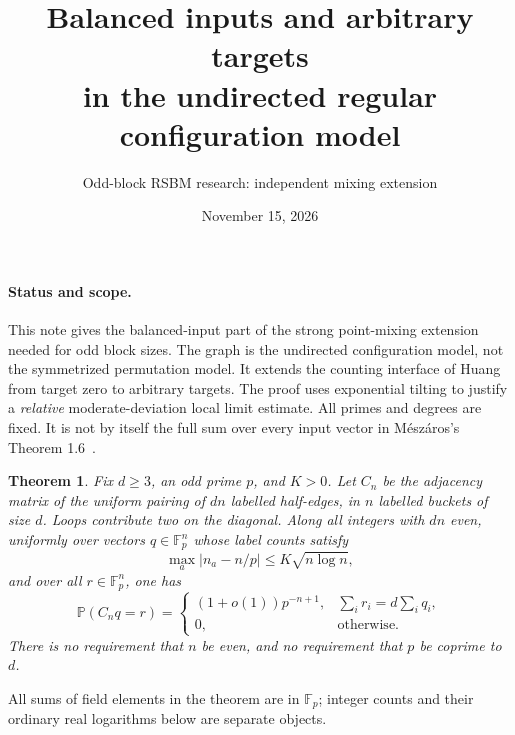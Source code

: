 \documentclass[11pt]{article}
\title{Balanced inputs and arbitrary targets\protect\\in the undirected regular configuration model}
\author{Odd-block RSBM research: independent mixing extension}
\date{November 15, 2026}
\newtheorem{theorem}{Theorem}
\newcommand{\Fp}{\mathbb F_p}
\newcommand{\Prob}{\mathbb P}
\begin{document}
\maketitle

\paragraph{Status and scope.}
This note gives the balanced-input part of the strong point-mixing
extension needed for odd block sizes. The graph is the undirected
configuration model, not the symmetrized permutation model. It extends
the counting interface of Huang~\cite[Proposition 2.2]{Huang} from target
zero to arbitrary targets. The proof uses exponential tilting to justify
a \emph{relative} moderate-deviation local limit estimate. All primes and
degrees are fixed. It is not by itself the full sum over every input
vector in M\'esz\'aros's Theorem 1.6~\cite{Meszaros}.

\begin{theorem}\label{thm:main}
Fix $d\ge3$, an odd prime $p$, and $K>0$. Let $C_n$ be the adjacency
matrix of the uniform pairing of $dn$ labelled half-edges, in $n$
labelled buckets of size $d$. Loops contribute two on the diagonal.
Along all integers with $dn$ even, uniformly over vectors $q\in\Fp^n$
whose label counts satisfy
\[
 \max_a|n_a-n/p|\le K\sqrt{n\log n},
\]
and over all $r\in\Fp^n$, one has
\[
 \Prob(C_nq=r)=
 \begin{cases}
 (1+o(1))p^{-n+1},&\sum_i r_i=d\sum_iq_i,\\
 0,&\text{otherwise}.
 \end{cases}
\]
There is no requirement that $n$ be even, and no requirement that
$p$ be coprime to $d$.
\end{theorem}

All sums of field elements in the theorem are in $\Fp$; integer counts
and their ordinary real logarithms below are separate objects.
\end{document}
